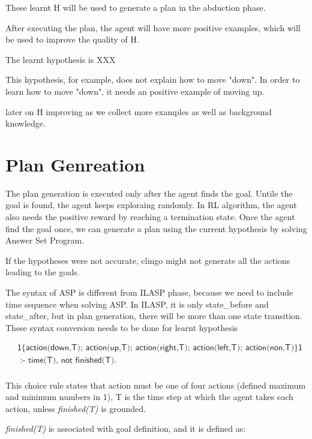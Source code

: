 These learnt H will be used to generate a plan in the abduction phase.

After executing the plan, the agent will have more positive examples, which will be used to improve the quality of H.

The learnt hypothesis is XXX

This hypothesis, for example, does not explain how to move "down". In order to learn how to move "down", it needs an positive example of moving up.

later on H improving as we collect more examples as well as background knowledge.

\section{Plan Genreation}
\label{Plan_genreation}

The plan generation is executed only after the agent finds the goal. Untile the goal is found, the agent keeps exploraing randomly.
In RL algorithm, the agent also needs the positive reward by reaching a termination state. 
Once the agent find the goal once, we can generate a plan using the current hypothesis by solving Answer Set Program.

If the hypotheses were not accurate, clingo might not generate all the actions leading to the goals.

The syntax of ASP is different from ILASP phase, because we need to include time sequence when solving ASP.
In ILASP, it is only state\_before and state\_after, but in plan generation, there will be more than one state transition.
These syntax conversion needs to be done for learnt hypothesis

\begin{equation}
\begin{split}
&\textsf{1\{action(down,T); action(up,T); action(right,T); action(left,T); action(non,T)\}1} \\
&\textsf{ :- time(T), not finished(T).}\\
\end{split}
\end{equation}

This choice rule states that action must be one of four actions (defined maximum and minimum numbers in 1),
T is the time step at which the agent takes each action, unless \textit{finished(T)} is grounded.

\textit{finished(T)} is associated with goal definition, and it is defined as:

